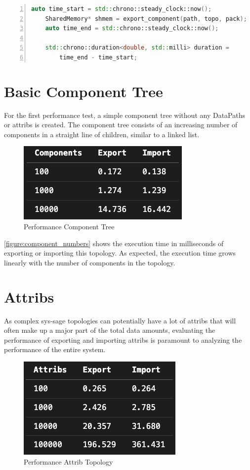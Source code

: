 \begin{lstlisting}[language=c++, numbers=left, caption= Measuring the Execution Time, captionpos=b, label={lst:performance_code}]
    auto time_start = std::chrono::steady_clock::now();
    SharedMemory* shmem = export_component(path, topo, pack);
    auto time_end = std::chrono::steady_clock::now();

    std::chrono::duration<double, std::milli> duration =
        time_end - time_start;
\end{lstlisting}

\section{Basic Component Tree}
For the first performance test, a simple component tree without any DataPaths or attribs is created. The component tree consists of an increasing number of components in a straight line of children, similar to a linked list.

\begin{figure}[ht]
    \includegraphics[scale=0.75]{images/component_numbers.png} %
    \centering
    \caption{Performance Component Tree}
    \label{figure:component_numbers}
\end{figure}

\autoref{figure:component_numbers} shows the execution time in milliseconds of exporting or importing this topology. As expected, the execution time grows linearly with the number of components in the topology.

\section{Attribs}
As complex sys-sage topologies can potentially have a lot of attribs that will often make up a major part of the total data amounts, evaluating the performance of exporting and importing
attribs is paramount to analyzing the performance of the entire system.

\begin{figure}[ht]
    \includegraphics[scale=0.75]{images/attrib_numbers.png} %
    \centering
    \caption{Performance Attrib Topology}
    \label{figure:attrib_numbers}
\end{figure}

